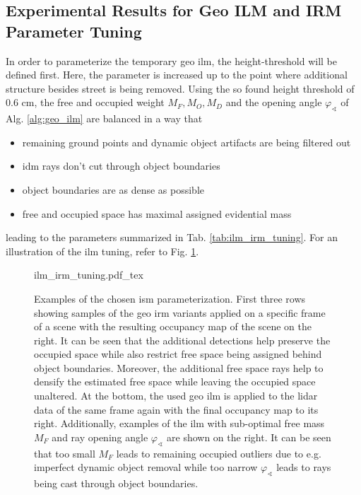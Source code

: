 \subsection{Experimental Results for Geo ILM and IRM Parameter Tuning}
\label{subsec:exp_results_params_ilm_irm}
In order to parameterize the temporary geo \gls{ilm}, the height-threshold will be defined first. Here, the parameter is increased up to the point where additional structure besides street is being removed. Using the so found height threshold of 0.6 cm, the free and occupied weight $M_F, M_O, M_D$ and the opening angle $\varphi_\sphericalangle$ of Alg. \ref{alg:geo_ilm} are balanced in a way that 
\begin{itemize}
	\item remaining ground points and dynamic object artifacts are being filtered out
	\item \gls{idm} rays don't cut through object boundaries
	\item object boundaries are as dense as possible
	\item free and occupied space has maximal assigned evidential mass
\end{itemize}
leading to the parameters summarized in Tab. \ref{tab:ilm_irm_tuning}. For an illustration of the \gls{ilm} tuning, refer to Fig. \ref{fig:ilm_irm_tuning}.
\begin{figure}[H]
	\begin{center}
		{ilm_irm_tuning.pdf_tex}
		\caption{\label{fig:ilm_irm_tuning}Examples of the chosen \gls{ism} parameterization. First three rows showing samples of the geo \gls{irm} variants applied on a specific frame of a scene with the resulting occupancy map of the scene on the right. It can be seen that the additional detections help preserve the occupied space while also restrict free space being assigned behind object boundaries. Moreover, the additional free space rays help to densify the estimated free space while leaving the occupied space unaltered. At the bottom, the used geo \gls{ilm} is applied to the lidar data of the same frame again with the final occupancy map to its right. Additionally, examples of the \gls{ilm} with sub-optimal free mass $M_F$ and ray opening angle $\varphi_\sphericalangle$ are shown on the right. It can be seen that too small $M_F$ leads to remaining occupied outliers due to e.g. imperfect dynamic object removal while too narrow $\varphi_\sphericalangle$ leads to rays being cast through object boundaries.}
	\end{center}
\end{figure} 
